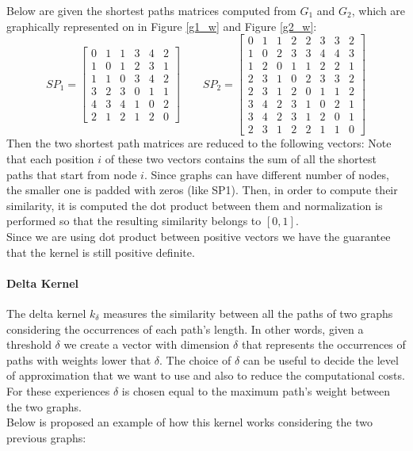 \documentclass[11pt,a4paper]{article}
\begin{document}
Below are given the shortest paths matrices computed from $G_1$ and $G_2$, which are graphically represented on in Figure \ref{g1_w} and Figure \ref{g2_w}:
$$
SP_1 = \begin{bmatrix}
	0 & 1 & 1 & 3 & 4 & 2\\
	1 & 0 & 1 & 2 & 3 & 1\\
	1 & 1 & 0 & 3 & 4 & 2\\
	3 & 2 & 3 & 0 & 1 & 1\\
	4 & 3 & 4 & 1 & 0 & 2\\
	2 & 1 & 2 & 1 & 2 & 0
\end{bmatrix}
\qquad
SP_2 = \begin{bmatrix}
0 & 1 & 1 & 2 & 2 & 3 & 3 & 2\\
1 & 0 & 2 & 3 & 3 & 4 & 4 & 3\\
1 & 2 & 0 & 1 & 1 & 2 & 2 & 1\\
2 & 3 & 1 & 0 & 2 & 3 & 3 & 2\\
2 & 3 & 1 & 2 & 0 & 1 & 1 & 2\\
3 & 4 & 2 & 3 & 1 & 0 & 2 & 1\\
3 & 4 & 2 & 3 & 1 & 2 & 0 & 1\\
2 & 3 & 1 & 2 & 2 & 1 & 1 & 0
\end{bmatrix}
$$
Then the two shortest path matrices are reduced to the following vectors:
Note that each position $i$ of these two vectors contains the sum of all the shortest paths that start from node $i$. Since graphs can have different number of nodes, the smaller one is padded with zeros (like SP1). Then, in order to compute their similarity, it is computed the dot product between them and normalization is performed so that the resulting similarity belongs to $[0,1]$. \\
Since we are using dot product between positive vectors we have the guarantee that the kernel is still positive definite.


\paragraph{Delta Kernel} The delta kernel $k_\delta$ measures the similarity between all the paths of two graphs considering the occurrences of each path's length. In other words, given a threshold $\delta$ we create a vector with dimension $\delta$ that represents the occurrences of paths with weights lower that $\delta$. The choice of $\delta$ can be useful to decide the level of approximation that we want to use and also to reduce the computational costs. For these experiences $\delta$ is chosen equal to the maximum path's weight between the two graphs.\\
Below is proposed an example of how this kernel works considering the two previous graphs:
\end{document}
